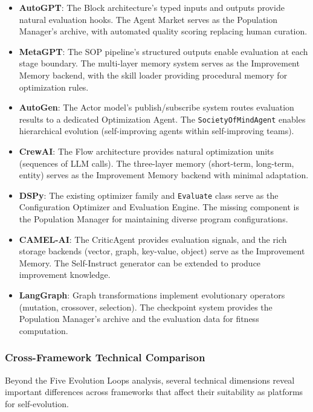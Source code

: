 \begin{itemize}
    \item \textbf{AutoGPT}: The Block architecture's typed inputs and outputs provide natural evaluation hooks. The Agent Market serves as the Population Manager's archive, with automated quality scoring replacing human curation.
    \item \textbf{MetaGPT}: The SOP pipeline's structured outputs enable evaluation at each stage boundary. The multi-layer memory system serves as the Improvement Memory backend, with the skill loader providing procedural memory for optimization rules.
    \item \textbf{AutoGen}: The Actor model's publish/subscribe system routes evaluation results to a dedicated Optimization Agent. The \texttt{SocietyOfMindAgent} enables hierarchical evolution (self-improving agents within self-improving teams).
    \item \textbf{CrewAI}: The Flow architecture provides natural optimization units (sequences of LLM calls). The three-layer memory (short-term, long-term, entity) serves as the Improvement Memory backend with minimal adaptation.
    \item \textbf{DSPy}: The existing optimizer family and \texttt{Evaluate} class serve as the Configuration Optimizer and Evaluation Engine. The missing component is the Population Manager for maintaining diverse program configurations.
    \item \textbf{CAMEL-AI}: The CriticAgent provides evaluation signals, and the rich storage backends (vector, graph, key-value, object) serve as the Improvement Memory. The Self-Instruct generator can be extended to produce improvement knowledge.
    \item \textbf{LangGraph}: Graph transformations implement evolutionary operators (mutation, crossover, selection). The checkpoint system provides the Population Manager's archive and the evaluation data for fitness computation.
\end{itemize}

\subsubsection{Cross-Framework Technical Comparison}

Beyond the Five Evolution Loops analysis, several technical dimensions reveal important differences across frameworks that affect their suitability as platforms for self-evolution.

